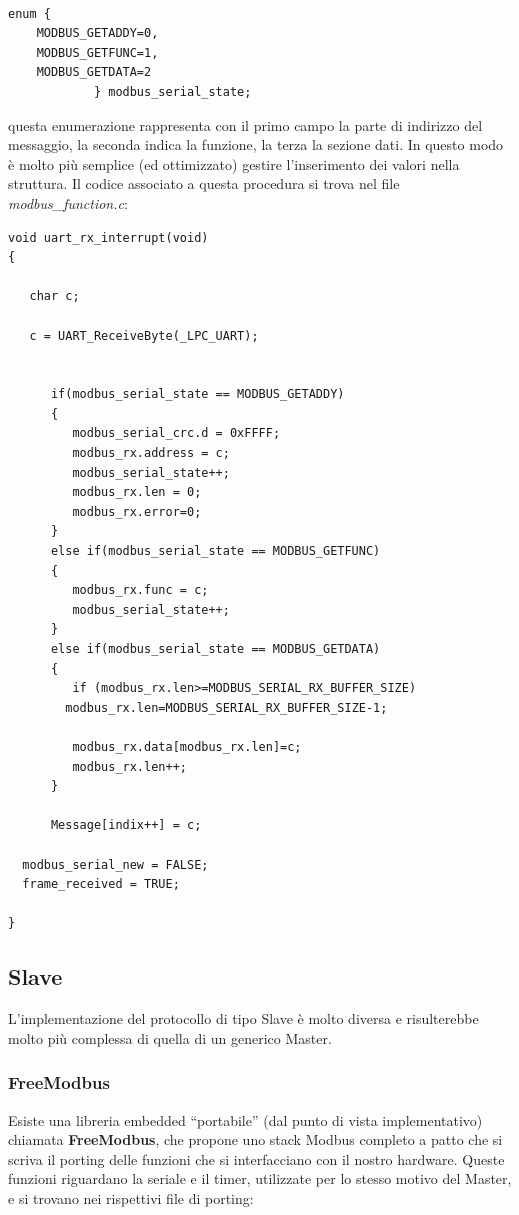 \documentclass[a4paper,titlepage]{book}
\begin{document}
\begin{lstlisting}[showlines=false]

enum {
	MODBUS_GETADDY=0, 
	MODBUS_GETFUNC=1, 
	MODBUS_GETDATA=2 
			} modbus_serial_state;

\end{lstlisting}

questa enumerazione rappresenta con il primo campo la parte di indirizzo del messaggio, la seconda indica la funzione, la terza la sezione dati. In questo modo è molto più semplice (ed ottimizzato) gestire l'inserimento dei valori nella struttura.
\newpage
Il codice associato a questa procedura si trova nel file \textit{modbus\_function.c}:

\begin{lstlisting}[showlines=true, firstnumber=202]
void uart_rx_interrupt(void)
{

   char c;

   c = UART_ReceiveByte(_LPC_UART);


      if(modbus_serial_state == MODBUS_GETADDY)
      {
         modbus_serial_crc.d = 0xFFFF;
         modbus_rx.address = c;
         modbus_serial_state++;
         modbus_rx.len = 0;
         modbus_rx.error=0;
      }
      else if(modbus_serial_state == MODBUS_GETFUNC)
      {
         modbus_rx.func = c;
         modbus_serial_state++;
      }
      else if(modbus_serial_state == MODBUS_GETDATA)
      {
         if (modbus_rx.len>=MODBUS_SERIAL_RX_BUFFER_SIZE) 
		modbus_rx.len=MODBUS_SERIAL_RX_BUFFER_SIZE-1;

         modbus_rx.data[modbus_rx.len]=c;
         modbus_rx.len++;
      }

      Message[indix++] = c;

  modbus_serial_new = FALSE;
  frame_received = TRUE;

}
\end{lstlisting}

\subsection{Slave}


L'implementazione del protocollo di tipo Slave è molto diversa e risulterebbe molto più complessa di quella di un generico Master.

\subsubsection{FreeModbus}

Esiste una libreria embedded ``portabile'' (dal punto di vista implementativo) chiamata \textbf{FreeModbus}, che propone uno stack Modbus completo a patto che si scriva il porting delle funzioni che si interfacciano con il nostro hardware. Queste funzioni riguardano la seriale e il timer, utilizzate per lo stesso motivo del Master, e si trovano nei rispettivi file di porting:
\end{document}
